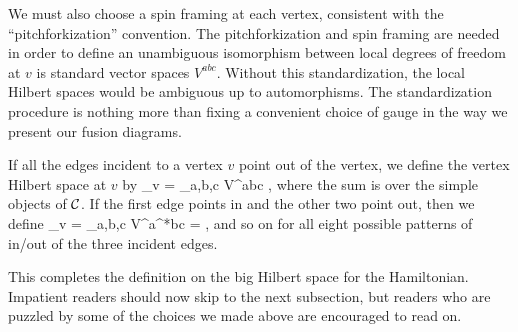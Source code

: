 We must also choose a spin framing at each vertex, consistent with the ``pitchforkization'' convention.
The pitchforkization and spin framing are needed in order to define an unambiguous
isomorphism between local degrees of freedom at $v$ is standard vector spaces $V^{abc}$.
Without this standardization, the local Hilbert spaces would be ambiguous up to automorphisms. 
The standardization procedure is nothing more than fixing a convenient choice of gauge in the way we present our fusion diagrams. 

If all the edges incident to a vertex $v$ point out of the vertex, we define the vertex Hilbert space at $v$ by 
\be
	\mch_v = \bigoplus_{a,b,c} V^{abc}  \quad\quad\quad\quad\quad\quad {},
	\label{pitchfork_basis}
\ee
where the sum is over the simple objects of $\mathcal{C}$.
If the first edge points in and the other two point out, then we define
\be
	\mch_v = \bigoplus_{a,b,c} V^{a^*bc}  \quad\quad\quad\quad\quad\quad {} =  ,
\ee
and so on for all eight possible patterns of in/out of the three incident edges.

\medskip

This completes the definition on the big Hilbert space for the Hamiltonian.
Impatient readers should now skip to the next subsection, but readers who are puzzled by some of the choices we made above 
are encouraged to read on.

\medskip

